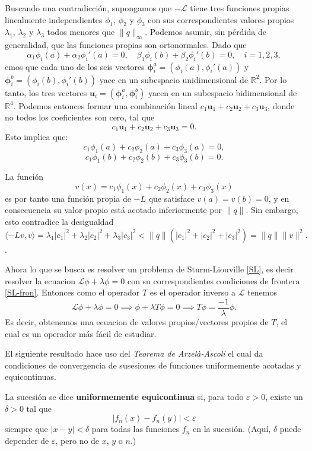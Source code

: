 \documentclass[main.tex]{subfiles}
\begin{document}
Buscando una contradicción, supongamos que $-\mathcal{L}$ tiene tres funciones propias linealmente independientes $\phi_1$, $\phi_2$ y $\phi_3$ con sus correspondientes valores propios $\lambda_1$, $\lambda_2$ y $\lambda_3$ todos menores que $\|q\|_{\infty}$. Podemos asumir, sin pérdida de generalidad, que las funciones propias son ortonormales. Dado que
\[
\alpha_1 \phi_i(a) + \alpha_2 \phi_i'(a) = 0, \quad \beta_1 \phi_i(b) + \beta_2 \phi_i'(b) = 0, \quad i = 1,2,3,
\]
emos que cada uno de los seis vectores $\boldsymbol{\phi}^{a}_{i}=(\phi_i(a), \phi_i'(a))$ y $\boldsymbol{\phi}^{b}_{i}=(\phi_i(b), \phi_i'(b))$ yace en un subespacio unidimensional de $\mathbb{R}^2$. Por lo tanto, los tres vectores $\mathbf{u}_i = (\boldsymbol{\phi}_i^{a},\boldsymbol{\phi}_i^{b})$ yacen en un subespacio bidimensional de $\mathbb{R}^4$. Podemos entonces formar una combinación lineal $c_1 \mathbf{u}_1 + c_2 \mathbf{u}_2 + c_3 \mathbf{u}_3$, donde no todos los coeficientes son cero, tal que
\[
c_1 \mathbf{u}_1 + c_2 \mathbf{u}_2 + c_3 \mathbf{u}_3 = 0.
\]
Esto implica que:
\[
c_1 \phi_1(a) + c_2 \phi_2(a) + c_3 \phi_3(a) = 0,
\]
\[
c_1 \phi_1(b) + c_2 \phi_2(b) + c_3 \phi_3(b) = 0.
\]

La función
\[
v(x) = c_1 \phi_1(x) + c_2 \phi_2(x) + c_3 \phi_3(x)
\]
es por tanto una función propia de $-L$ que satisface $v(a) = v(b) = 0$, y en consecuencia su valor propio está acotado inferiormente por $\|q\|$. Sin embargo, esto contradice la desigualdad
\[
\langle -L v, v \rangle = \lambda_1 |c_1|^2 + \lambda_2 |c_2|^2 + \lambda_3 |c_3|^2 < \|q\|(|c_1|^2 + |c_2|^2 + |c_3|^2) = \|q\| \|v\|^2.
\]
\QED.

Ahora lo que se busca es resolver un problema de Sturm-Liouville \ref{SL}, es decir resolver la ecuacion $\mathcal{L}\phi+\lambda\phi=0$ con su correspondientes condiciones de frontera \ref{SL-fron}. Entonces como el operador $T$ es el operador inverso a $\mathcal{L}$ tenemos
\[
\mathcal{L}\phi+\lambda\phi=0\implies\phi+\lambda T\phi=0\implies T\phi=\frac{-1}{\lambda}\phi.
\]
Es decir, obtenemos una ecuacion de valores propios/vectores propios de $T$, el cual es un operador más fácil de estudiar.

\obs El siguiente resultado hace uso del \emph{Teorema de Arzelà-Ascoli} el cual da condiciones de convergencia de susesiones de funciones uniformemente acotadas y equicontinuas.

\begin{def.}
La sucesión se dice \textbf{uniformemente equicontinua} si, para todo $\varepsilon > 0$, existe un $\delta > 0$ tal que
\[
|f_n(x) - f_n(y)| < \varepsilon
\]
siempre que $|x - y| < \delta$ para todas las funciones $f_n$ en la sucesión. (Aquí, $\delta$ puede depender de $\varepsilon$, pero no de $x$, $y$ o $n$.)
\end{def.}
\end{document}
